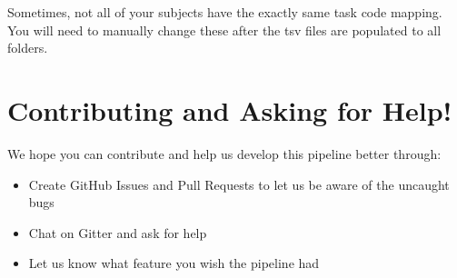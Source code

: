 \documentclass[12pt]{myland}
\begin{document}
Sometimes, not all of your subjects have the exactly same task code mapping. You will need to manually
change these after the tsv files are populated to all folders.


\section{Contributing and Asking for Help!}
We hope you can contribute and help us develop this pipeline better through:
\begin{itemize}
    \item Create GitHub Issues and Pull Requests to let us be aware of the uncaught bugs
    \item Chat on Gitter and ask for help
    \item Let us know what feature you wish the pipeline had 
\end{itemize}
\end{document}
